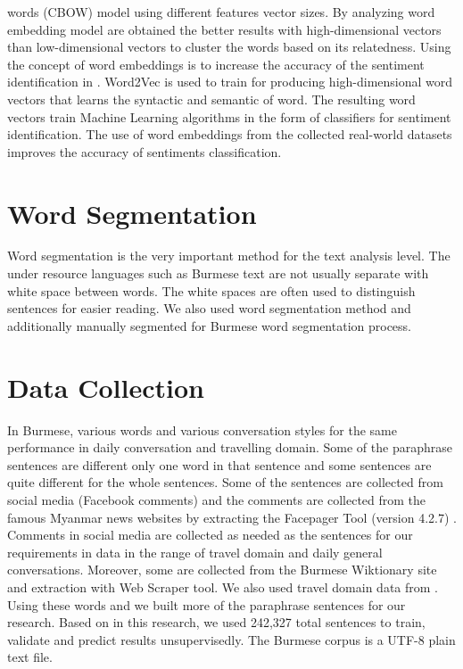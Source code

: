 \documentclass[conference]{IEEEtran}
\begin{document}
words (CBOW) model using different features vector sizes. By analyzing word embedding model are obtained the better results with high-dimensional vectors than low-dimensional vectors to cluster the words based on its relatedness. Using the concept of word embeddings is to increase the accuracy of the sentiment identification in \cite{b6}. Word2Vec is used to train for producing high-dimensional word vectors that learns the syntactic and semantic of word. The resulting word vectors train Machine Learning algorithms in the form of classifiers for sentiment identification. The use of word embeddings from the collected real-world datasets improves the accuracy of sentiments classification.

\section{Word Segmentation}\label{Sec:wordsegmentation}
Word segmentation is the very important method for the text analysis level. The under resource languages such as Burmese text are not usually separate with white space between words. The white spaces are often used to distinguish sentences for easier reading. We also used word segmentation method \cite{b7} and additionally manually segmented for Burmese word segmentation process.

\section{Data Collection}\label{Sec:datacollection}
In Burmese, various words and various conversation styles for the same performance in daily conversation and travelling domain. Some of the paraphrase sentences are different only one word in that sentence and some sentences are quite different for the whole sentences. Some of the sentences are collected from social media (Facebook comments) and the comments are collected from the famous Myanmar news websites by extracting the Facepager Tool (version 4.2.7) \cite{b8}. Comments in social media are collected as needed as the sentences for our requirements in data in the range of travel domain and daily general conversations. Moreover, some are collected from the Burmese Wiktionary \cite{b9} site and extraction with Web Scraper tool. We also used travel domain data from \cite{10}. Using these words and we built more of the paraphrase sentences for our research. Based on \cite{b11} in this research, we used 242,327 total sentences to train, validate and predict results unsupervisedly. The Burmese  corpus is a UTF-8 plain text file.
\end{document}
